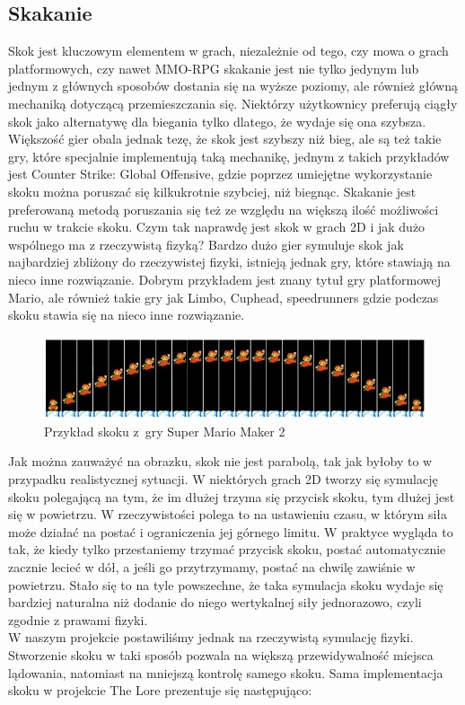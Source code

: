 \documentclass[oneside,polski,logo]{amuthesis}
\begin{document}
\subsection{Skakanie} 
Skok jest kluczowym elementem w grach, niezależnie od tego, czy mowa o grach platformowych, czy nawet MMO-RPG skakanie jest nie tylko jedynym lub jednym z głównych sposobów dostania się na wyższe poziomy, ale również główną mechaniką dotyczącą przemieszczania się. Niektórzy użytkownicy preferują ciągły skok jako alternatywę dla biegania tylko dlatego, że wydaje się ona szybsza. Większość gier obala jednak tezę, że skok jest szybszy niż bieg, ale są też takie gry, które specjalnie implementują taką mechanikę, jednym z takich przykładów jest Counter Strike: Global Offensive, gdzie poprzez umiejętne wykorzystanie skoku można poruszać się kilkukrotnie szybciej, niż biegnąc. Skakanie jest preferowaną metodą poruszania się też ze względu na większą ilość możliwości ruchu w trakcie skoku.
Czym tak naprawdę jest skok w grach 2D i jak dużo wspólnego ma z rzeczywistą fizyką? Bardzo dużo gier symuluje skok jak najbardziej zbliżony do rzeczywistej fizyki, istnieją jednak gry, które stawiają na nieco inne rozwiązanie. Dobrym przykładem jest znany tytuł gry platformowej Mario, ale również takie gry jak Limbo, Cuphead, speedrunners gdzie podczas skoku stawia się na nieco inne rozwiązanie. \cite{jumping1} 

\begin{figure}[h]
	\centering
	\includegraphics[width=13cm]{images/kozubal/mario.jpg}
	\caption{Przykład skoku z~gry Super Mario Maker 2 \cite{jumping3}}
\end{figure}

\newpage
Jak można zauważyć na obrazku, skok nie jest parabolą, tak jak byłoby to w przypadku realistycznej sytuacji. W niektórych grach 2D tworzy się symulację skoku polegającą na tym, że im dłużej trzyma się przycisk skoku, tym dłużej jest się w powietrzu. W rzeczywistości polega to na ustawieniu czasu, w którym siła może działać na postać i ograniczenia jej górnego limitu. W praktyce wygląda to tak, że kiedy tylko przestaniemy trzymać przycisk skoku, postać automatycznie zacznie lecieć w dół, a jeśli go przytrzymamy, postać na chwilę zawiśnie w powietrzu. Stało się to na tyle powszechne, że taka symulacja skoku wydaje się bardziej naturalna niż dodanie do niego wertykalnej siły jednorazowo, czyli zgodnie z prawami fizyki. \cite{jumping2} \\ W naszym projekcie postawiliśmy jednak na rzeczywistą symulację fizyki. Stworzenie skoku w taki sposób pozwala na większą przewidywalność miejsca lądowania, natomiast na mniejszą kontrolę samego skoku. Sama implementacja skoku w projekcie The Lore prezentuje się następująco:
\end{document}
